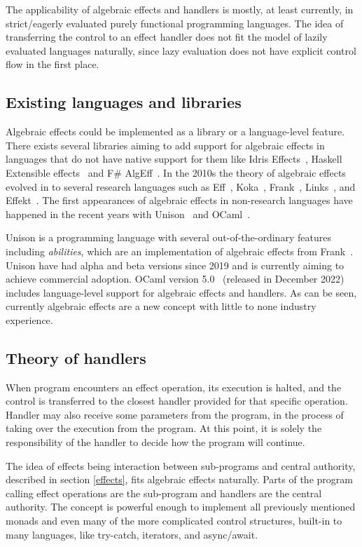 The applicability of algebraic effects and handlers is mostly, at least currently, in strict/eagerly evaluated purely functional programming languages. The idea of transferring the control to an effect handler does not fit the model of lazily evaluated languages naturally, since lazy evaluation does not have explicit control flow in the first place.~\cite{alg-effs-for-fp}


\subsection{Existing languages and libraries}
Algebraic effects could be implemented as a library or a language-level feature. There exists several libraries aiming to add support for algebraic effects in languages that do not have native support for them like Idris Effects~\cite{idris-effects}, Haskell Extensible effects~\cite{extensible-effects} and F\# AlgEff~\cite{fsharp-alg-eff}. In the 2010s the theory of algebraic effects evolved in to several research languages such as Eff~\cite{eff-lang}, Koka~\cite{koka-lang}, Frank~\cite{frank-lang}, Links~\cite{links-lang}, and Effekt~\cite{effekt-lang}. The first appearances of algebraic effects in non-research languages have happened in the recent years with Unison~\cite{unison-lang} and OCaml~\cite{ocaml-lang}.

Unison is a programming language with several out-of-the-ordinary features including \textit{abilities}, which are an implementation of algebraic effects from Frank~\cite{frank-lang}. Unison have had alpha and beta versions since 2019 and is currently aiming to achieve commercial adoption. OCaml version 5.0~\cite{ocaml-v5} (released in December 2022) includes language-level support for algebraic effects and handlers. As can be seen, currently algebraic effects are a new concept with little to none industry experience.


\subsection{Theory of handlers}
When program encounters an effect operation, its execution is halted, and the control is transferred to the closest handler provided for that specific operation. Handler may also receive some parameters from the program, in the process of taking over the execution from the program. At this point, it is solely the responsibility of the handler to decide how the program will continue.

The idea of effects being interaction between sub-programs and central authority, described in section \ref{effects}, fits algebraic effects naturally. Parts of the program calling effect operations are the sub-program and handlers are the central authority. The concept is powerful enough to implement all previously mentioned monads and even many of the more complicated control structures, built-in to many languages, like try-catch, iterators, and async/await.~\cite{alg-effs-for-fp}

